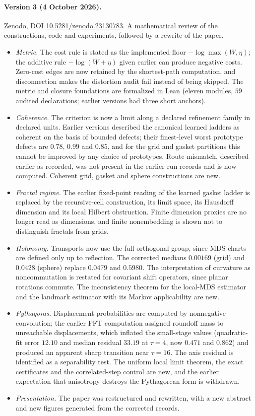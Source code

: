 \paragraph{Version 3 (4 October 2026).}
Zenodo, DOI \href{https://doi.org/10.5281/zenodo.23130783}{10.5281/zenodo.23130783}.
A mathematical review of the constructions, code and experiments, followed by a rewrite of the paper.
\begin{itemize}[leftmargin=*]
\item \emph{Metric.} The cost rule is stated as the implemented floor $-\log\max(W,\eta)$; the additive rule $-\log(W+\eta)$ given earlier can produce negative costs. Zero-cost edges are now retained by the shortest-path computation, and disconnection makes the distortion audit fail instead of being skipped. The metric and closure foundations are formalized in Lean (eleven modules, $59$ audited declarations; earlier versions had three short anchors).
\item \emph{Coherence.} The criterion is now a limit along a declared refinement family in declared units. Earlier versions described the canonical learned ladders as coherent on the basis of bounded defects; their finest-level worst prototype defects are $0.78$, $0.99$ and $0.85$, and for the grid and gasket partitions this cannot be improved by any choice of prototypes. Route mismatch, described earlier as recorded, was not present in the earlier run records and is now computed. Coherent grid, gasket and sphere constructions are new.
\item \emph{Fractal regime.} The earlier fixed-point reading of the learned gasket ladder is replaced by the recursive-cell construction, its limit space, its Hausdorff dimension and its local Hilbert obstruction. Finite dimension proxies are no longer read as dimensions, and finite nonembedding is shown not to distinguish fractals from grids.
\item \emph{Holonomy.} Transports now use the full orthogonal group, since MDS charts are defined only up to reflection. The corrected medians $0.00169$ (grid) and $0.0428$ (sphere) replace $0.0479$ and $0.5980$. The interpretation of curvature as noncommutation is restated for covariant shift operators, since planar rotations commute. The inconsistency theorem for the local-MDS estimator and the landmark estimator with its Markov applicability are new.
\item \emph{Pythagoras.} Displacement probabilities are computed by nonnegative convolution; the earlier FFT computation assigned roundoff mass to unreachable displacements, which inflated the small-stage values (quadratic-fit error $12.10$ and median residual $33.19$ at $\tau=4$, now $0.471$ and $0.862$) and produced an apparent sharp transition near $\tau=16$. The axis residual is identified as a separability test. The uniform local limit theorem, the exact certificates and the correlated-step control are new, and the earlier expectation that anisotropy destroys the Pythagorean form is withdrawn.
\item \emph{Presentation.} The paper was restructured and rewritten, with a new abstract and new figures generated from the corrected records.
\end{itemize}
